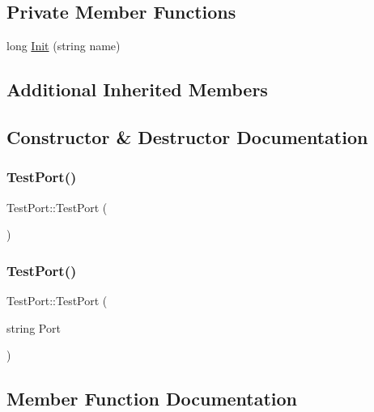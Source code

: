 \subsection*{Private Member Functions}
\begin{DoxyCompactItemize}
\item 
long \hyperlink{classTestPort_adbc256fed358ebb6bf3243ccd187170f}{Init} (string name)
\end{DoxyCompactItemize}
\subsection*{Additional Inherited Members}


\subsection{Constructor \& Destructor Documentation}
\mbox{\label{classTestPort_adde46780527e08b738eb5b32defa1c3a}} 
\subsubsection{\texorpdfstring{Test\+Port()}{TestPort()}\hspace{0.1cm}{\footnotesize\ttfamily [1/2]}}
{\footnotesize\ttfamily Test\+Port\+::\+Test\+Port (\begin{DoxyParamCaption}{ }\end{DoxyParamCaption})}

\mbox{\label{classTestPort_a93293d14818c76db0b4ef1273cf5ce19}} 
\subsubsection{\texorpdfstring{Test\+Port()}{TestPort()}\hspace{0.1cm}{\footnotesize\ttfamily [2/2]}}
{\footnotesize\ttfamily Test\+Port\+::\+Test\+Port (\begin{DoxyParamCaption}\item[{string}]{Port }\end{DoxyParamCaption})}



\subsection{Member Function Documentation}
\mbox{\label{classTestPort_abf6a7327e26838aaf3e2e4482668085f}} 
